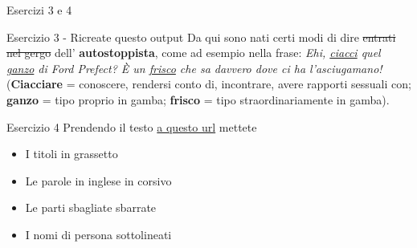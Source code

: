 \begin{frame}{Esercizi 3 e 4}

\begin{block}{Esercizio 3 - Ricreate questo output}
Da qui sono nati certi modi di dire \sout{entrati nel gergo} dell'
\textbf{autostoppista}, come ad esempio nella frase: \textit{Ehi, 
\underline{ciacci} quel \underline{ganzo} di Ford Prefect? È un
\underline{frisco} che sa davvero dove ci ha l’asciugamano!} (\textbf{Ciacciare}
 = conoscere, rendersi conto di, incontrare, avere rapporti sessuali con; 
\textbf{ganzo} = tipo proprio in gamba; \textbf{frisco} = tipo
straordinariamente in gamba).
\end{block}

\begin{block}{Esercizio 4}
	Prendendo il testo \href{http://www.google.it}{a questo url} mettete
	\begin{itemize}
	\item I titoli in grassetto
	\item Le parole in inglese in corsivo
	\item Le parti sbagliate sbarrate
	\item I nomi di persona sottolineati
	\end{itemize}
\end{block}

\end{frame}
